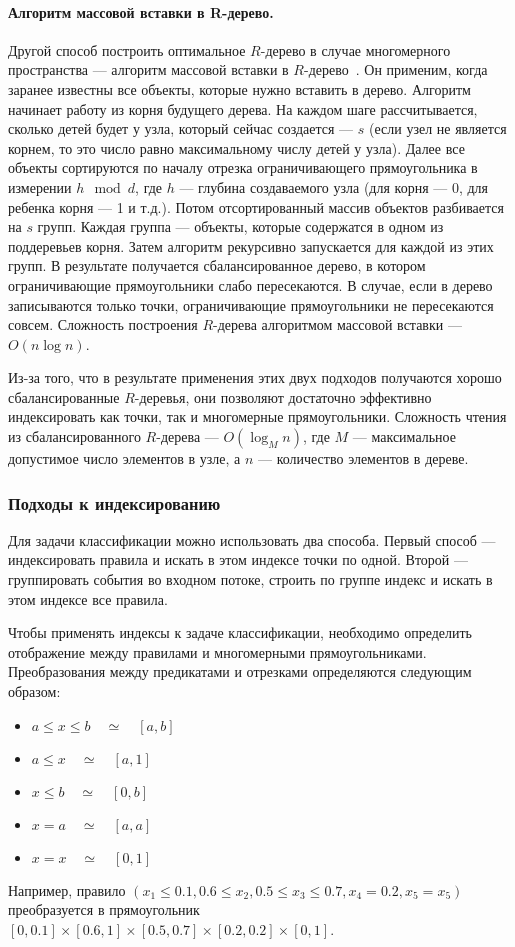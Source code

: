 \documentclass[14pt]{article}
\begin{document}
\paragraph{Алгоритм массовой вставки в R-дерево.} Другой способ построить оптимальное $R$-дерево в случае многомерного пространства --- алгоритм массовой вставки в $R$-дерево~\cite{str, omt}. Он применим, когда заранее известны все объекты, которые нужно вставить в дерево. Алгоритм начинает работу из корня будущего дерева. На каждом шаге рассчитывается, сколько детей будет у узла, который сейчас создается --- $s$ (если узел не является корнем, то это число равно максимальному числу детей у узла). Далее все объекты сортируются по началу отрезка ограничивающего прямоугольника в измерении $h\mod d$, где $h$ --- глубина создаваемого узла (для корня --- 0, для ребенка корня --- 1 и т.д.). Потом отсортированный массив объектов разбивается на $s$ групп. Каждая группа --- объекты, которые содержатся в одном из поддеревьев корня. Затем алгоритм рекурсивно запускается для каждой из этих групп. В результате получается сбалансированное дерево, в котором ограничивающие прямоугольники слабо пересекаются. В случае, если в дерево записываются только точки, ограничивающие прямоугольники не пересекаются совсем. Сложность построения $R$-дерева алгоритмом массовой вставки --- $O(n\log n)$.

Из-за того, что в результате применения этих двух подходов получаются хорошо сбалансированные $R$-деревья, они позволяют достаточно эффективно индексировать как точки, так и многомерные прямоугольники. Сложность чтения из сбалансированного $R$-дерева --- $O(\log_M n)$, где $M$ --- максимальное допустимое число элементов в узле, а $n$ --- количество элементов в дереве.

\subsubsection{Подходы к индексированию}
\label{section:indexingApproaches}
Для задачи классификации можно использовать два способа. Первый способ --- индексировать правила и искать в этом индексе точки по одной. Второй --- группировать события во входном потоке, строить по группе индекс и искать в этом индексе все правила.

Чтобы применять индексы к задаче классификации, необходимо определить отображение между правилами и многомерными прямоугольниками. Преобразования между предикатами и отрезками определяются следующим образом:
\begin{itemize}
    \item $a \leq x \leq b \quad \simeq \quad [a ,b]$
    \item $a \leq x \quad \simeq \quad [a, 1]$
    \item $x \leq b \quad \simeq \quad [0, b]$
    \item $ x = a \quad \simeq \quad [a, a]$
    \item $ x = x \quad \simeq \quad [0, 1]$
\end{itemize}
Например, правило $(x_1 \leq 0.1, 0.6 \leq x_2, 0.5 \leq x_3 \leq 0.7, x_4 = 0.2, x_5 = x_5)$ преобразуется в прямоугольник $[0, 0.1]\times[0.6, 1]\times[0.5, 0.7]\times[0.2, 0.2]\times[0, 1]$.
\end{document}
